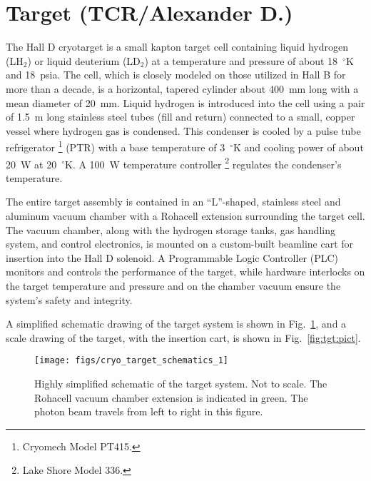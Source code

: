\section[Target (TCR)]{Target \label{sec:target} (TCR/Alexander D.)}
The Hall D cryotarget is a small kapton target cell containing liquid
hydrogen (LH$_2$) or liquid deuterium (LD$_2$) at a temperature and pressure
of about 18~$^\circ$K and 18~psia. The cell, which is closely modeled on those
utilized in Hall B for more than a decade, is a horizontal, tapered
cylinder about 400~mm long with a mean diameter of 20~mm.  Liquid
hydrogen is introduced into the cell using a pair of 1.5~m long
stainless steel tubes (fill and return) connected to a small, copper
vessel where hydrogen gas is condensed.  This condenser is cooled by a
pulse tube refrigerator%
\footnote{Cryomech Model PT415.}
(PTR) with a base temperature of 3~$^\circ$K and
cooling power of about 20~W at 20~$^\circ$K.  
A 100~W temperature controller%
\footnote{Lake Shore Model 336.}
regulates the condenser's temperature.

The entire target assembly is contained in an ``L''-shaped,
stainless steel and aluminum vacuum chamber with a Rohacell extension
surrounding the target cell.  The vacuum chamber, along with the
hydrogen storage tanks, gas handling system, and control electronics,
is mounted on a custom-built beamline cart for insertion into the Hall
D solenoid.  A Programmable Logic Controller (PLC) monitors and
controls the performance of the target, while hardware interlocks on
the target temperature and pressure and on the chamber vacuum ensure
the system's safety and integrity.

A simplified schematic drawing of the target system is shown in 
Fig.~\ref{fig:tgt:scheme}, and a scale drawing of the target, 
with the insertion cart, is shown in Fig.~\ref{fig:tgt:pict}.



\begin{figure}[h]
\begin{center}
    \texttt{[image: figs/cryo\_target\_schematics\_1]}
\end{center}
\caption{
Highly simplified schematic of the target system.  Not to scale.  The
Rohacell vacuum chamber extension is indicated in green.  The photon
beam travels from left to right in this figure.
\label{fig:tgt:scheme}}
\end{figure}

